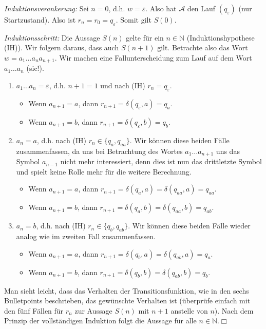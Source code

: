 \documentclass[11pt, a4paper]{article}
\newcommand{\qedbox}{\hfill \ensuremath{\Box}}
\begin{document}
\textit{Induktionsverankerung:} Sei $n = 0$, d.h. $w = \varepsilon$. Also hat $\mathcal{A}$ den Lauf $(q_\varepsilon)$ (nur Startzustand). Also ist $r_n = r_0 = q_\varepsilon$. Somit gilt $S(0)$. \checkmark\par
\textit{Induktionsschritt:} Die Aussage $S(n)$ gelte für ein $n \in \mathbb{N}$ (Induktionshypothese (IH)). Wir folgern daraus, dass auch $S(n+1)$ gilt. Betrachte also das Wort $w = a_1 \ldots a_n a_{n+1}$. Wir machen eine Fallunterscheidung zum Lauf auf dem Wort $a_1 \ldots a_n$ (sic!).
\begin{enumerate}
	\item $a_1 \ldots a_n = \varepsilon$, d.h. $n+1 = 1$ und nach (IH) $r_n = q_\varepsilon$.
		\begin{itemize}
			\item Wenn $a_{n+1} = a$, dann $r_{n+1} = \delta(q_\varepsilon, a) = q_a$.
			\item Wenn $a_{n+1} = b$, dann $r_{n+1} = \delta(q_\varepsilon, b) = q_b$.
		\end{itemize}
	\item $a_n = a$, d.h. nach (IH) $r_n \in \{q_a, q_{aa}\}$. Wir können diese beiden Fälle zusammenfassen, da uns bei Betrachtung des Wortes $a_1 \ldots a_{n+1}$ uns das Symbol $a_{n-1}$ nicht mehr interessiert, denn dies ist nun das drittletzte Symbol und spielt keine Rolle mehr für die weitere Berechnung.
		\begin{itemize}
			\item Wenn $a_{n+1} = a$, dann $r_{n+1} = \delta(q_a, a) = \delta(q_{aa}, a) = q_{aa}$.
			\item Wenn $a_{n+1} = b$, dann $r_{n+1} = \delta(q_a, b) = \delta(q_{aa}, b) = q_{ab}$.
		\end{itemize}
	\item $a_n = b$, d.h. nach (IH) $r_n \in \{q_b, q_{ab}\}$. Wir können diese beiden Fälle wieder analog wie im zweiten Fall zusammenfassen.
		\begin{itemize}
			\item Wenn $a_{n+1} = a$, dann $r_{n+1} = \delta(q_b, a) = \delta(q_{ab}, a) = q_a$.
			\item Wenn $a_{n+1} = b$, dann $r_{n+1} = \delta(q_b, b) = \delta(q_{ab}, b) = q_b$.
		\end{itemize}
\end{enumerate}
Man sieht leicht, dass das Verhalten der Transitionsfunktion, wie in den sechs Bulletpoints beschrieben, das gewünschte Verhalten ist (überprüfe einfach mit den fünf Fällen für $r_n$ zur Aussage $S(n)$ mit $n+1$ anstelle von $n$). Nach dem Prinzip der vollständigen Induktion folgt die Aussage für alle $n \in \mathbb{N}$.\qedbox
\end{document}
